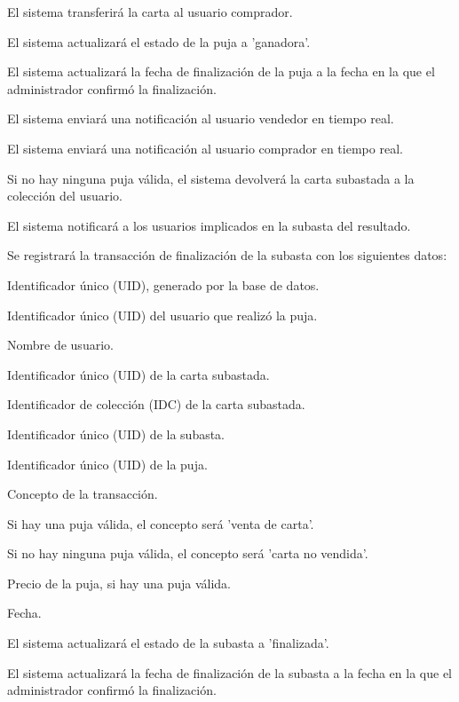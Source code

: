 \begin{RFSubastas}
\begin{RFSubastas}
\begin{RFSubastas}
\begin{RFSubastas}
				\item El sistema transferirá la carta al usuario comprador.
				\item El sistema actualizará el estado de la puja a 'ganadora'.
				\item El sistema actualizará la fecha de finalización de la puja a la fecha en la que el administrador confirmó la finalización.
				\item El sistema enviará una notificación al usuario vendedor en tiempo real.
				\item El sistema enviará una notificación al usuario comprador en tiempo real.
			\end{RFSubastas}

			\item Si no hay ninguna puja válida, el sistema devolverá la carta subastada a la colección del usuario.
		\end{RFSubastas}
		\item El sistema notificará a los usuarios implicados en la subasta del resultado.
	
		\item Se registrará la transacción de finalización de la subasta con los siguientes datos:
			\begin{RFSubastas}
				\item Identificador único (UID), generado por la base de datos.
				\item Identificador único (UID) del usuario que realizó la puja.
				\item Nombre de usuario.
				\item Identificador único (UID) de la carta subastada.
				\item Identificador de colección (IDC) de la carta subastada.
				\item Identificador único (UID) de la subasta.
				\item Identificador único (UID) de la puja.
				\item Concepto de la transacción.
				\begin{RFSubastas}
					\item Si hay una puja válida, el concepto será 'venta de carta'.
					\item Si no hay ninguna puja válida, el concepto será 'carta no vendida'.
				\end{RFSubastas}
				\item Precio de la puja, si hay una puja válida.
				\item Fecha.
			\end{RFSubastas}
		\item El sistema actualizará el estado de la subasta a 'finalizada'.
		\item El sistema actualizará la fecha de finalización de la subasta a la fecha en la que el administrador confirmó la finalización.
	
	\end{RFSubastas}
	
	
\end{RFSubastas}